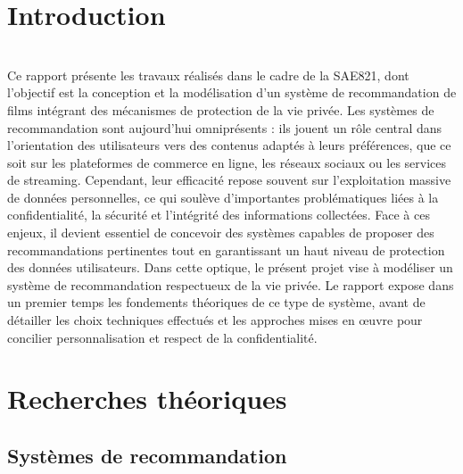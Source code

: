 \documentclass{article}
\begin{document}
\tableofcontents
\newpage

\section*{Introduction}
$ $\\
Ce rapport présente les travaux réalisés dans le cadre de la SAE821, dont l’objectif est la conception et la modélisation d’un système de recommandation de films intégrant des mécanismes de protection de la vie privée. Les systèmes de recommandation sont aujourd’hui omniprésents : ils jouent un rôle central dans l’orientation des utilisateurs vers des contenus adaptés à leurs préférences, que ce soit sur les plateformes de commerce en ligne, les réseaux sociaux ou les services de streaming.
Cependant, leur efficacité repose souvent sur l’exploitation massive de données personnelles, ce qui soulève d’importantes problématiques liées à la confidentialité, la sécurité et l’intégrité des informations collectées. Face à ces enjeux, il devient essentiel de concevoir des systèmes capables de proposer des recommandations pertinentes tout en garantissant un haut niveau de protection des données utilisateurs.
Dans cette optique, le présent projet vise à modéliser un système de recommandation respectueux de la vie privée. Le rapport expose dans un premier temps les fondements théoriques de ce type de système, avant de détailler les choix techniques effectués et les approches mises en œuvre pour concilier personnalisation et respect de la confidentialité.


\section{Recherches théoriques}
\subsection{Systèmes de recommandation}
\end{document}
